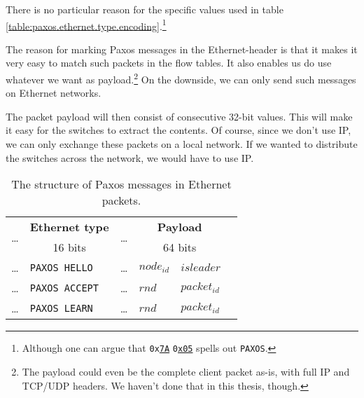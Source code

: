 There is no particular reason for the specific values used in table
\ref{table:paxos.ethernet.type.encoding}.\footnote{Although one can argue
that \texttt{0x\underline{7A}} \texttt{0\underline{x05}} spells out \texttt{PAXOS}.}

The reason for marking Paxos messages in the
Ethernet-header is that it
makes it very easy to match such packets in the flow
tables.  It also
enables us do use whatever we want as payload.\footnote{The payload could
even be the complete client packet as-is, with full IP and TCP/UDP
headers.  We haven't done that in this thesis, though.} On the downside,
we can only send such messages on Ethernet networks.

The packet payload will then consist of consecutive 32-bit values.
This will make it easy for the switches to extract the contents.
Of course, since we don't use IP, we can only exchange these packets on a
local network.  If we wanted to distribute the switches across the network,
we would have to use IP.

\begin{table}[H]
  \centering
  \begin{tabular}{l|l|l|l|l|l|}
    \hline
      \multirow{2}{*}{\dots} &
      \multicolumn{1}{c|}{\textbf{Ethernet type}} &
      \multirow{2}{*}{\dots} &
      \multicolumn{2}{c|}{\textbf{Payload}} \\

      &
      \multicolumn{1}{c|}{16 bits} &
      &
      \multicolumn{2}{c|}{64 bits} \\

    \hline
      \dots & \texttt{PAXOS HELLO}  &
      \dots & $node_{id}$ & $isleader$ \\

    \hline
      \dots & \texttt{PAXOS ACCEPT} &
      \dots & $rnd$ & $packet_{id}$ \\

    \hline
      \dots & \texttt{PAXOS LEARN} &
      \dots & $rnd$ & $packet_{id}$ \\

    \hline
  \end{tabular}

  \caption{The structure of Paxos messages in Ethernet packets.}
  \label{table:paxos.ethernet.packet}
\end{table}

